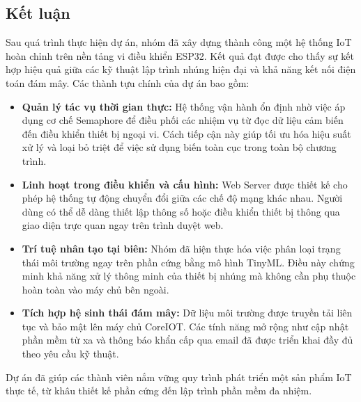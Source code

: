 \subsection{Kết luận}
Sau quá trình thực hiện dự án, nhóm đã xây dựng thành công một hệ thống IoT hoàn chỉnh trên nền tảng vi điều khiển ESP32. Kết quả đạt được cho thấy sự kết hợp hiệu quả giữa các kỹ thuật lập trình nhúng hiện đại và khả năng kết nối điện toán đám mây. Các thành tựu chính của dự án bao gồm:
\begin{itemize}
    \item \textbf{Quản lý tác vụ thời gian thực:} Hệ thống vận hành ổn định nhờ việc áp dụng cơ chế Semaphore để điều phối các nhiệm vụ từ đọc dữ liệu cảm biến đến điều khiển thiết bị ngoại vi. Cách tiếp cận này giúp tối ưu hóa hiệu suất xử lý và loại bỏ triệt để việc sử dụng biến toàn cục trong toàn bộ chương trình.
    \item \textbf{Linh hoạt trong điều khiển và cấu hình:} Web Server được thiết kế cho phép hệ thống tự động chuyển đổi giữa các chế độ mạng khác nhau. Người dùng có thể dễ dàng thiết lập thông số hoặc điều khiển thiết bị thông qua giao diện trực quan ngay trên trình duyệt web.
    \item \textbf{Trí tuệ nhân tạo tại biên:} Nhóm đã hiện thực hóa việc phân loại trạng thái môi trường ngay trên phần cứng bằng mô hình TinyML. Điều này chứng minh khả năng xử lý thông minh của thiết bị nhúng mà không cần phụ thuộc hoàn toàn vào máy chủ bên ngoài.
    \item \textbf{Tích hợp hệ sinh thái đám mây:} Dữ liệu môi trường được truyền tải liên tục và bảo mật lên máy chủ CoreIOT. Các tính năng mở rộng như cập nhật phần mềm từ xa và thông báo khẩn cấp qua email đã được triển khai đầy đủ theo yêu cầu kỹ thuật.
\end{itemize}
Dự án đã giúp các thành viên nắm vững quy trình phát triển một sản phẩm IoT thực tế, từ khâu thiết kế phần cứng đến lập trình phần mềm đa nhiệm.

